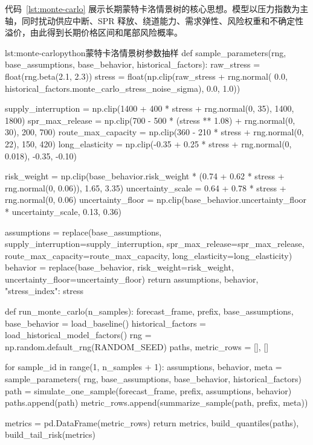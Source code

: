 代码~\ref{lst:monte-carlo} 展示长期蒙特卡洛情景树的核心思想。模型以压力指数为主轴，同时扰动供应中断、SPR 释放、绕道能力、需求弹性、风险权重和不确定性溢价，由此得到长期价格区间和尾部风险概率。

\begin{paperlisting}{lst:monte-carlo}{python}{蒙特卡洛情景树参数抽样}
def sample_parameters(rng, base_assumptions, base_behavior, historical_factors):
    raw_stress = float(rng.beta(2.1, 2.3))
    stress = float(np.clip(raw_stress + rng.normal(
        0.0, historical_factors.monte_carlo_stress_noise_sigma), 0.0, 1.0))

    supply_interruption = np.clip(1400 + 400 * stress + rng.normal(0, 35), 1400, 1800)
    spr_max_release = np.clip(700 - 500 * (stress ** 1.08) + rng.normal(0, 30), 200, 700)
    route_max_capacity = np.clip(360 - 210 * stress + rng.normal(0, 22), 150, 420)
    long_elasticity = np.clip(-0.35 + 0.25 * stress + rng.normal(0, 0.018),
                              -0.35, -0.10)

    risk_weight = np.clip(base_behavior.risk_weight * (0.74 + 0.62 * stress
                                                       + rng.normal(0, 0.06)),
                          1.65, 3.35)
    uncertainty_scale = 0.64 + 0.78 * stress + rng.normal(0, 0.06)
    uncertainty_floor = np.clip(base_behavior.uncertainty_floor * uncertainty_scale,
                                0.13, 0.36)

    assumptions = replace(base_assumptions,
                          supply_interruption=supply_interruption,
                          spr_max_release=spr_max_release,
                          route_max_capacity=route_max_capacity,
                          long_elasticity=long_elasticity)
    behavior = replace(base_behavior,
                       risk_weight=risk_weight,
                       uncertainty_floor=uncertainty_floor)
    return assumptions, behavior, {"stress_index": stress}

def run_monte_carlo(n_samples):
    forecast_frame, prefix, base_assumptions, base_behavior = load_baseline()
    historical_factors = load_historical_model_factors()
    rng = np.random.default_rng(RANDOM_SEED)
    paths, metric_rows = [], []

    for sample_id in range(1, n_samples + 1):
        assumptions, behavior, meta = sample_parameters(
            rng, base_assumptions, base_behavior, historical_factors)
        path = simulate_one_sample(forecast_frame, prefix, assumptions, behavior)
        paths.append(path)
        metric_rows.append(summarize_sample(path, prefix, meta))

    metrics = pd.DataFrame(metric_rows)
    return metrics, build_quantiles(paths), build_tail_risk(metrics)
\end{paperlisting}

